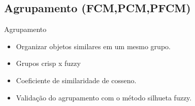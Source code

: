 \documentclass[brazil]{beamer}
\begin{document}
\subsection{Agrupamento (FCM,PCM,PFCM)}

\begin{frame}{Agrupamento}
  \begin{itemize}
    \item<1 -> Organizar objetos similares em um mesmo grupo. 
    \item<2 -> Grupos crisp x fuzzy
    \item<3 -> Coeficiente de similaridade de cosseno.
    \item<4 -> Validação do agrupamento com o método silhueta fuzzy.
  \end{itemize} 
\end{frame}
\end{document}
